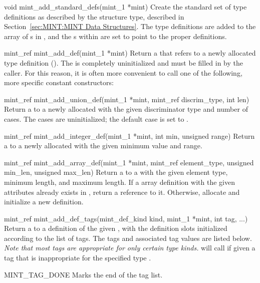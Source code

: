 \begin{cprototypelist}
  \item[void mint_add_standard_defs(mint_1 *mint)]
  Create the standard set of \MINT{} type definitions as described by the
   structure type, described in
  Section~\ref{sec:MINT:MINT Data Structures}.  The \MINT{} type definitions
  are added to the array of s in , and the
  s within  are set to point to
  the proper definitions.

  \item[mint_ref mint_add_def(mint_1 *mint)]
  Return a  that refers to a newly allocated \MINT{} type
  definition ().  The  is completely
  uninitialized and must be filled in by the caller.  For this reason, it is
  often more convenient to call one of the following, more specific constant
  constructors:
  \begin{cprototypelist}
    \item[mint_ref mint_add_union_def(mint_1 *mint, mint_ref discrim_type,
                                      int len)]
    Return a  to a newly allocated  with the
    given discriminator type and number of cases.  The cases are uninitialized;
    the default case is set to .

    \item[mint_ref mint_add_integer_def(mint_1 *mint, int min, unsigned range)]
    Return a  to a newly allocated  with the
    given minimum value and range.

    \item[mint_ref mint_add_array_def(mint_1 *mint, mint_ref element_type,
                                      unsigned min_len, unsigned max_len)]
    Return a  to a  with the given element
    type, minimum length, and maximum length.  If a \MINT{} array definition
    with the given attributes already exists in , return a
    reference to it.  Otherwise, allocate and initialize a new 
    definition.

    \item[mint_ref mint_add_def_tags(mint_def_kind kind, mint_1 *mint, int tag,
                                     ...)]
    Return a  to a \MINT{} definition of the given
    , with the definition slots initialized according to the
    list of tags.  The tags and associated tag values are listed below.
    \emph{Note that most tags are appropriate for only certain \MINT{} type
    kinds.}   will call  if given
    a tag that is inappropriate for the specified \MINT{} type
    .
    \begin{cidentifierlist}
      \item[MINT_TAG_DONE]
      \tagtypenull{} Marks the end of the tag list.


\end{cidentifierlist}
\end{cprototypelist}
\end{cprototypelist}
